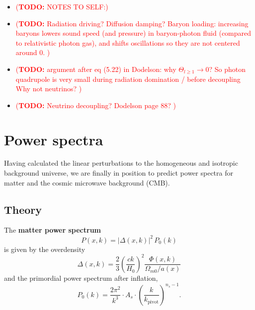 \documentclass[10pt,a4paper]{article}
\newcommand\TODO[1]{\textcolor{red}{(\textbf{TODO:} #1)}}
\begin{document}
\begin{itemize}
\item
\TODO{NOTES TO SELF:}

\item
\TODO{
Radiation driving?
Diffusion damping?
Baryon loading: increasing baryons lowers sound speed (and pressure) in baryon-photon fluid (compared to relativistic photon gas),
and shifts oscillations so they are not centered around $0$.
}

\item
\TODO{argument after eq (5.22) in Dodelson: why $\Theta_{l \geq 1} \rightarrow 0$?
So photon quadrupole is very small during radiation domination / before decoupling
Why not neutrinos?
}

\item
\TODO{
Neutrino decoupling? Dodelson page 88?
}
\end{itemize}

\clearpage
\section{Power spectra}
\label{sec_power_spectra}

Having calculated the linear perturbations to the homogeneous and isotropic background universe,
we are finally in position to predict power spectra for matter and the cosmic microwave background (CMB).

\subsection{Theory}

The \textbf{matter power spectrum}
\begin{equation}
	P(x,k) = |\Delta(x,k)|^2 \, P_0(k)
\label{eq_Pk}
\end{equation}
is given by the overdensity
\begin{equation}
	\Delta(x,k) = \frac23 \left( \frac{ck}{H_0} \right)^2 \frac{\Phi(x,k)}{\Omega_{m0}/a(x)}
\end{equation}
and the primordial power spectrum after inflation,
\begin{equation}
	P_0(k) = \frac{2\pi^2}{k^3} \cdot A_s \cdot \left( \frac{k}{k_\text{pivot}} \right)^{n_s-1}.
\label{eq_P_primordial}
\end{equation}
\end{document}

